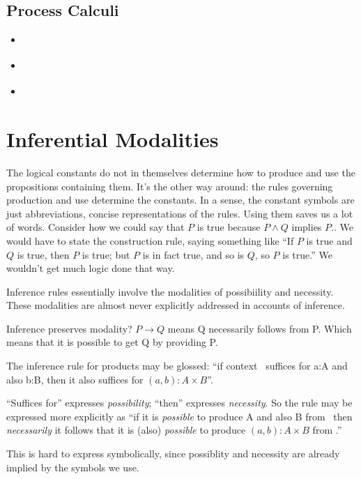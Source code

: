 \documentclass{article}
\begin{document}
\subsection{Process Calculi}

\begin{itemize}
\item {} \cite{sangiorgi2003pi}
\item {} \cite{milner1999communicating}
\item {} \cite{Honda00secureinformation}
\end{itemize}

\section{Inferential Modalities}

The logical constants do not in themselves determine how to produce
and use the propositions containing them. It's the other way around:
the rules governing production and use determine the constants. In a
sense, the constant symbols are just abbreviations, concise
representations of the rules. Using them saves us a lot of words.
Consider how we could say that \(P\) is true because \(P\land Q\)
implies \(P\).. We would have to state the construction rule, saying
something like ``If \(P\) is true and \(Q\) is true, then \(P\) is
true; but \(P\) is in fact true, and so is \(Q\), so \(P\) is true.''
We wouldn't get much logic done that way.

Inference rules essentially involve the modalities of possibiility and
necessity. These modalities are almost never explicitly addressed in
accounts of inference.

Inference preserves modality? \(P\rightarrow Q\) means Q necessarily
follows from P. Which means that it is possible to get Q by
providing P.

The inference rule for products may be glossed: ``if
context \ContextG\ suffices for a:A and also b:B, then it also suffices for \( (a,b):A\times B\)''.

``Suffices for'' expresses \textit{possibility}; ``then'' expresses
\textit{necessity}. So the rule may be expressed more explicitly as
``if it is \textit{possible} to produce A and also B from \Gamma\,
then \textit{necessarily} it follows that it is (also)
\textit{possible} to produce \( (a,b):A\times B \) from \Gamma.''

This is hard to express symbolically, since possiblity and necessity
are already implied by the symbols we use.
\end{document}
